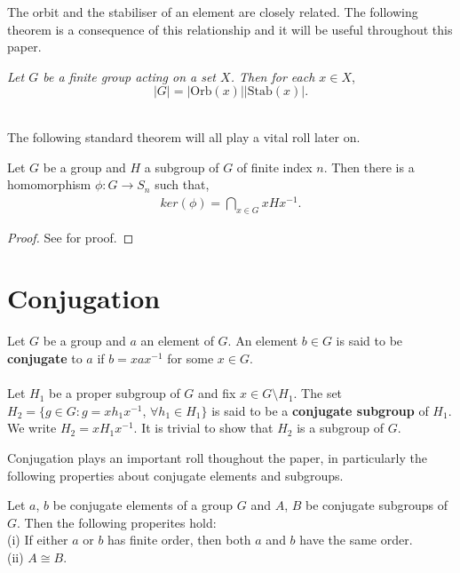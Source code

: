 The orbit and the stabiliser of an element are closely related. The following theorem is a consequence of this relationship and it will be useful throughout this paper. \\

\begin{theorem} \textit{Let $G$ be a finite group acting on a set $X$. Then for each $x \in X$}, $$|G| = |\text{Orb}(x)| |\text{Stab}(x)|.$$ \\
\end{theorem}

The following standard theorem will all play a vital roll later on.

\begin{theorem}\label{symhomoker} Let $G$ be a group and $H$ a subgroup of $G$ of finite index $n$. Then there is a homomorphism $\phi : G \longrightarrow S_n$ such that,
\begin{align*} ker(\phi) = \bigcap\limits_{x \in G} x H x^{-1}.
\end{align*}
\end{theorem}

\begin{proof} See \cite[p.110]{bhattacharya} for proof.
\end{proof}

\section{Conjugation}

\begin{definition}
Let $G$ be a group and $a$ an element of $G$. An element $b \in G$ is said to be \textbf{conjugate} to $a$ if $b=xax^{-1}$ for some $x \in G$. \\
\\
Let $H_1$ be a proper subgroup of $G$ and fix $x \in G \setminus H_1$. The set $H_2 = \{g \in G : g= xh_1x^{-1}$, $\forall h_1 \in H_1\}$ is said to be a \textbf{conjugate subgroup} of $H_1$. We write $H_2 = xH_1x^{-1}$. It is trivial to show that $H_2$ is a subgroup of $G$.
\end{definition}

Conjugation plays an important roll thoughout the paper, in particularly the following properties about conjugate elements and subgroups.

\begin{proposition}\label{conjugateprop} Let $a$, $b$ be conjugate elements of a group $G$ and $A$, $B$ be conjugate subgroups of $G$. Then the following properites hold: \vspace{3mm} \\
(i) If either $a$ or $b$ has finite order, then both $a$ and $b$ have the same order. \vspace{3mm} \\
(ii) $A \cong B$. \\
\end{proposition}


